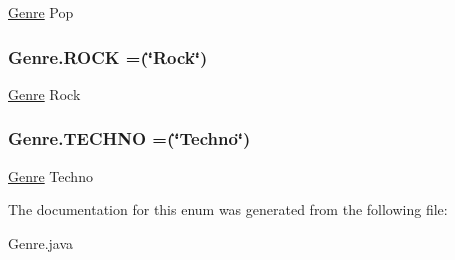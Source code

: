 \hyperlink{enumGenre}{Genre} Pop \hypertarget{enumGenre_abeba5ef2f501e1284b2a64cc3b153153}{
\subsubsection[{R\-O\-C\-K}]{\setlength{\rightskip}{0pt plus 5cm}Genre.\-R\-O\-C\-K =(\char`\"{}Rock\char`\"{})}}\label{enumGenre_abeba5ef2f501e1284b2a64cc3b153153}
\hyperlink{enumGenre}{Genre} Rock \hypertarget{enumGenre_af7ee5c3305bd4ab99555c3c5bd92e1a9}{
\subsubsection[{T\-E\-C\-H\-N\-O}]{\setlength{\rightskip}{0pt plus 5cm}Genre.\-T\-E\-C\-H\-N\-O =(\char`\"{}Techno\char`\"{})}}\label{enumGenre_af7ee5c3305bd4ab99555c3c5bd92e1a9}
\hyperlink{enumGenre}{Genre} Techno 

The documentation for this enum was generated from the following file\-:\begin{DoxyCompactItemize}
\item 
Genre.\-java\end{DoxyCompactItemize}
